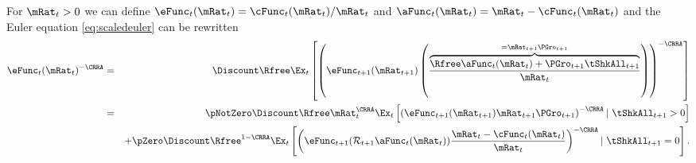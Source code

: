 \documentclass[titlepage]{\econtex}\providecommand{\texname}{BufferStockTheory}%
\begin{document}
For $\mRat_{t}>0$ we can define $\eFunc_{t}(\mRat_{t})=\cFunc_{t}(\mRat_{t})/\mRat_{t}$
and $\aFunc_{t}(\mRat_{t})=\mRat_{t}-\cFunc_{t}(\mRat_{t})$
and the Euler equation \eqref{eq:scaledeuler} can be rewritten
\begin{eqnarray}
 \eFunc_{t}(\mRat_{t})^{-\CRRA} & = & \Discount \Rfree \Ex_{t}\left[\left(\eFunc_{t+1}({\mRat}_{t+1})\left(\frac{\overbrace{\Rfree \aFunc_{t}(\mRat_{t})+{\PGro}_{t+1}{\tShkAll}_{t+1}}^{=\mRat_{t+1}\PGro_{t+1}}}{\mRat_{t}}\right)\right)^{-\CRRA }\right] \label{eq:eFuncEuler}
\\ & = & \phantom{ + }\pNotZero \Discount \Rfree \mRat_{t}^{\CRRA} \Ex_{t}\left[ \left(\eFunc_{t+1}(\mRat_{t+1}) \mRat_{t+1}\PGro_{t+1}\right)^{-\CRRA} |~ \tShkAll_{t+1}>0 \right] \notag
\\ &  & + \pZero  \Discount \Rfree^{1-\CRRA} \Ex_{t}\left[\left(\eFunc_{t+1}(\mathcal{R}_{t+1}\aFunc_{t}(\mRat_{t}))\frac{\mRat_t-\cFunc_{t}(\mRat_{t})}{\mRat_{t}}\right)^{-\CRRA} |~ \tShkAll_{t+1} = 0 \right]  \label{eq:eRho}.
\end{eqnarray}

\end{document}
